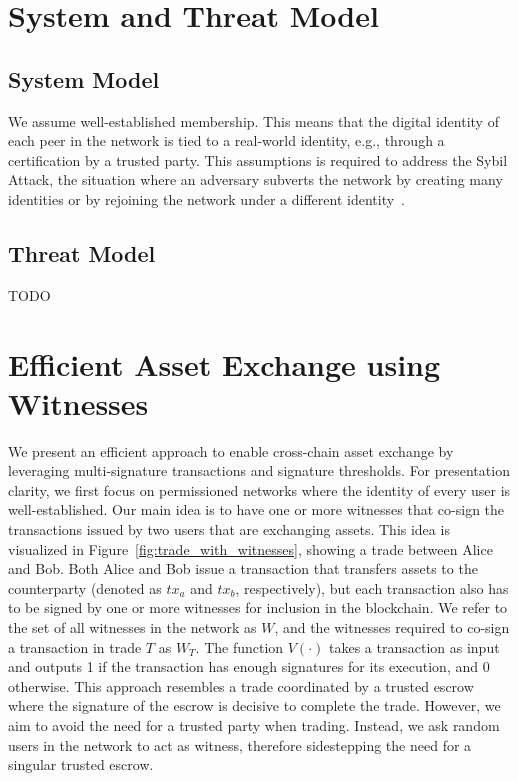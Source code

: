 \documentclass{article}
\begin{document}
\section{System and Threat Model}

\subsection{System Model}
We assume well-established membership.
This means that the digital identity of each peer in the network is tied to a real-world identity, e.g., through a certification by a trusted party.
This assumptions is required to address the Sybil Attack, the situation where an adversary subverts the network by creating many identities or by rejoining the network under a different identity~\cite{douceur2002sybil}.

\subsection{Threat Model}
TODO

\section{Efficient Asset Exchange using Witnesses}
We present an efficient approach to enable cross-chain asset exchange by leveraging multi-signature transactions and signature thresholds.
For presentation clarity, we first focus on permissioned networks where the identity of every user is well-established.
Our main idea is to have one or more witnesses that co-sign the transactions issued by two users that are exchanging assets.
This idea is visualized in Figure~\ref{fig:trade_with_witnesses}, showing a trade between Alice and Bob.
Both Alice and Bob issue a transaction that transfers assets to the counterparty (denoted as $ tx_a $ and $ tx_b $, respectively), but each transaction also has to be signed by one or more witnesses for inclusion in the blockchain.
We refer to the set of all witnesses in the network as $ W $, and the witnesses required to co-sign a transaction in trade $ T $ as $ W_T $.
The function $ V(\cdot) $ takes a transaction as input and outputs 1 if the transaction has enough signatures for its execution, and 0 otherwise.
This approach resembles a trade coordinated by a trusted escrow where the signature of the escrow is decisive to complete the trade.
However, we aim to avoid the need for a trusted party when trading.
Instead, we ask random users in the network to act as witness, therefore sidestepping the need for a singular trusted escrow.
\end{document}
